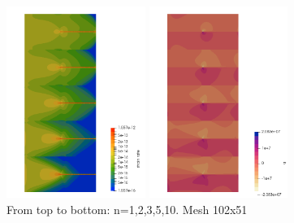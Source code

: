 \begin{center}
\includegraphics[width=4.52cm]{python_codes/fieldstone_87/results/experiment_07/sr}
\includegraphics[width=4.52cm]{python_codes/fieldstone_87/results/experiment_07/press}\\
{\captionfont From top to bottom: n=1,2,3,5,10. Mesh 102x51}
\end{center}










